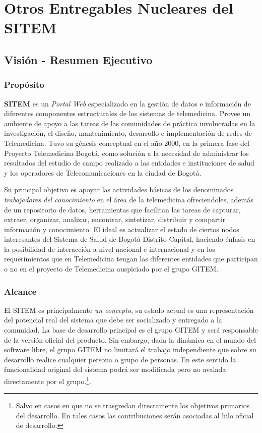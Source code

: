 \chapter{Otros Entregables Nucleares del SITEM}
\label{entregables}

\section{Visión - Resumen Ejecutivo}

\subsection{Propósito}

\textbf{SITEM }es un \textit{Portal Web} especializado en la gestión de datos e información de diferentes componentes estructurales de los sistemas de telemedicina. Provee un ambiente de apoyo a las tareas de las comunidades de práctica involucradas en la investigación, el diseño, mantenimiento, desarrollo e implementación de redes de Telemedicina. Tuvo su génesis conceptual en el año 2000, en la primera fase del Proyecto Telemedicina Bogotá, como solución a la necesidad de administrar los resultados del estudio de campo realizado a las entidades e instituciones de salud y los operadores de Telecomunicaciones en la ciudad de Bogotá.

Su principal objetivo es apoyar las actividades básicas de los denominados \textit{trabajadores del conocimiento} en el área de la telemedicina ofreciendoles, además de un repositorio de datos, herramientas que facilitan las tareas de capturar, extraer, organizar, analizar, encontrar, sintetizar, distribuir y compartir información y conocimiento. El ideal es actualizar el estado de ciertos nodos interesantes del Sistema de Salud de Bogotá Distrito Capital, haciendo énfasis en la posibilidad de interacción a nivel nacional e internacional y en los requerimientos que en Telemedicina tengan las diferentes entidades que participan o no en el proyecto de Telemedicina auspiciado por el grupo GITEM.

\subsection{Alcance}

El SITEM es principalmente \textit{un concepto}, su estado actual es una representación del potencial real del sistema que debe ser socializado y entregado a la comunidad. La base de desarrollo principal es el grupo GITEM y será responsable de la versión oficial del producto. Sin embargo, dada la dinámica en el mundo del software libre, el grupo GITEM no limitará el trabajo independiente que sobre su desarrollo realice cualquier persona o grupo de personas. En este sentido la funcionalidad original del sistema podrá ser modificada pero no avalada directamente por el grupo.\footnote{Salvo en casos en que no se trasgredan directamente los objetivos primarios del desarrollo. En tales casos las contribuciones serán asociadas al hilo oficial de desarrollo.}. 

